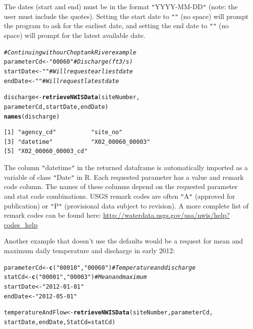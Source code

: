 \documentclass[a4paper,11pt]{article}\usepackage[]{graphicx}\usepackage[]{color}
\makeatletter
\newcommand{\hlstr}[1]{\textcolor[rgb]{0.192,0.494,0.8}{#1}}%
\newcommand{\hlcom}[1]{\textcolor[rgb]{0.678,0.584,0.686}{\textit{#1}}}%
\newcommand{\hlstd}[1]{\textcolor[rgb]{0.345,0.345,0.345}{#1}}%
\newcommand{\hlkwb}[1]{\textcolor[rgb]{0.69,0.353,0.396}{#1}}%
\newcommand{\hlkwc}[1]{\textcolor[rgb]{0.333,0.667,0.333}{#1}}%
\newcommand{\hlkwd}[1]{\textcolor[rgb]{0.737,0.353,0.396}{\textbf{#1}}}%
\newenvironment{kframe}{%
 \def\at@end@of@kframe{}%
 \ifinner\ifhmode%
  \def\at@end@of@kframe{\end{minipage}}%
  \begin{minipage}{\columnwidth}%
 \fi\fi%
 \def\FrameCommand##1{\hskip\@totalleftmargin \hskip-\fboxsep
 \colorbox{shadecolor}{##1}\hskip-\fboxsep
     \hskip-\linewidth \hskip-\@totalleftmargin \hskip\columnwidth}%
 \MakeFramed {\advance\hsize-\width
   \@totalleftmargin\z@ \linewidth\hsize
   \@setminipage}}%
 {\par\unskip\endMakeFramed%
 \at@end@of@kframe}
\newenvironment{knitrout}{}{} %
\makeatother
\begin{document}
The dates (start and end) must be in the format \texttt{"}YYYY-MM-DD\texttt{"} (note: the user must include the quotes).  Setting the start date to \texttt{"}\texttt{"} (no space) will prompt the program to ask for the earliest date, and setting the end date to \texttt{"}\texttt{"} (no space) will prompt for the latest available date.

\begin{knitrout}
\color{fgcolor}\begin{kframe}
\begin{alltt}
\hlcom{# Continuing with our Choptank River example}
\hlstd{parameterCd} \hlkwb{<-} \hlstr{"00060"}  \hlcom{# Discharge (ft3/s)}
\hlstd{startDate} \hlkwb{<-} \hlstr{""}  \hlcom{# Will request earliest date}
\hlstd{endDate} \hlkwb{<-} \hlstr{""} \hlcom{# Will request latest date}

\hlstd{discharge} \hlkwb{<-} \hlkwd{retrieveNWISData}\hlstd{(siteNumber,}
                    \hlstd{parameterCd, startDate, endDate)}
\hlkwd{names}\hlstd{(discharge)}
\end{alltt}
\begin{verbatim}
[1] "agency_cd"          "site_no"           
[3] "datetime"           "X02_00060_00003"   
[5] "X02_00060_00003_cd"
\end{verbatim}
\end{kframe}
\end{knitrout}

The column \texttt{"}datetime\texttt{"} in the returned dataframe is automatically imported as a variable of class \texttt{"}Date\texttt{"} in R. Each requested parameter has a value and remark code column.  The names of these columns depend on the requested parameter and stat code combinations. USGS remark codes are often \texttt{"}A\texttt{"} (approved for publication) or \texttt{"}P\texttt{"} (provisional data subject to revision). A more complete list of remark codes can be found here:
\url{http://waterdata.usgs.gov/usa/nwis/help?codes_help}

Another example that doesn't use the defaults would be a request for mean and maximum daily temperature and discharge in early 2012:
\begin{knitrout}
\color{fgcolor}\begin{kframe}
\begin{alltt}
\hlstd{parameterCd} \hlkwb{<-} \hlkwd{c}\hlstd{(}\hlstr{"00010"}\hlstd{,}\hlstr{"00060"}\hlstd{)}  \hlcom{# Temperature and discharge}
\hlstd{statCd} \hlkwb{<-} \hlkwd{c}\hlstd{(}\hlstr{"00001"}\hlstd{,}\hlstr{"00003"}\hlstd{)}  \hlcom{# Mean and maximum}
\hlstd{startDate} \hlkwb{<-} \hlstr{"2012-01-01"}
\hlstd{endDate} \hlkwb{<-} \hlstr{"2012-05-01"}

\hlstd{temperatureAndFlow} \hlkwb{<-} \hlkwd{retrieveNWISData}\hlstd{(siteNumber, parameterCd,}
        \hlstd{startDate, endDate,} \hlkwc{StatCd}\hlstd{=statCd)}
\end{alltt}
\end{kframe}
\end{knitrout}
\end{document}
